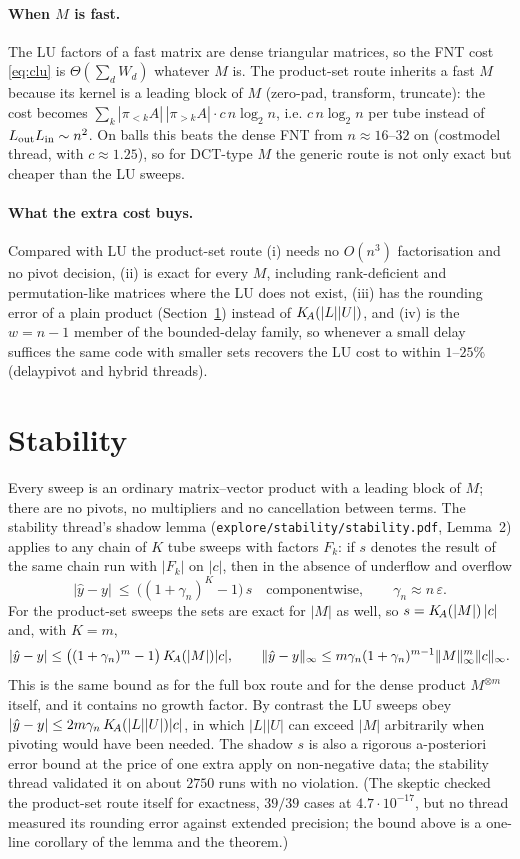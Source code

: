 \documentclass[11pt]{article}
\newcommand{\pr}[1]{\pi_{#1}}
\begin{document}
\paragraph{When $M$ is fast.} The LU factors of a fast matrix are dense triangular matrices, so the FNT cost
\eqref{eq:clu} is $\Theta(\sum_dW_d)$ whatever $M$ is. The product-set route inherits a fast $M$ because its kernel is a
leading block of $M$ (zero-pad, transform, truncate): the cost becomes $\sum_k|\pr{<k}A|\,|\pr{>k}A|\cdot c\,n\log_2n$, i.e.
$c\,n\log_2 n$ per tube instead of $L_{\rm out}L_{\rm in}\sim n^2$. On balls this beats the dense FNT from $n\approx16$--$32$ on
(costmodel thread, with $c\approx1.25$), so for DCT-type $M$ the generic route is not only exact but cheaper than the LU sweeps.

\paragraph{What the extra cost buys.} Compared with LU the product-set route (i) needs no $O(n^3)$ factorisation and no
pivot decision, (ii) is exact for every $M$, including rank-deficient and permutation-like matrices where the LU does not
exist, (iii) has the rounding error of a plain product (Section~\ref{sec:stab}) instead of $K_{\!A}(|L||U|)$, and (iv) is the
$w=n-1$ member of the bounded-delay family, so whenever a small delay suffices the same code with smaller sets
recovers the LU cost to within $1$--$25\%$ (delaypivot and hybrid threads).

\section{Stability}\label{sec:stab}
Every sweep is an ordinary matrix--vector product with a leading block of $M$; there are no pivots, no
multipliers and no cancellation between terms. The stability thread's shadow lemma
(\texttt{explore/stability/stability.pdf}, Lemma~2) applies to any chain of $K$ tube sweeps with factors $F_k$: if
$s$ denotes the result of the same chain run with $|F_k|$ on $|c|$, then in the absence of underflow and overflow
\[
 |\hat y-y|\ \le\ \big((1+\gamma_n)^K-1\big)\,s\quad\text{componentwise},\qquad \gamma_n\approx n\,\varepsilon .
\]
For the product-set sweeps the sets are exact for $|M|$ as well, so $s=K_{\!A}(|M|)\,|c|$ and, with $K=m$,
\[
 |\hat y-y|\le\big((1+\gamma_n)^m-1\big)\,K_{\!A}(|M|)|c|,\qquad \|\hat y-y\|_\infty\le m\gamma_n(1+\gamma_n)^{m-1}\|M\|_\infty^m\|c\|_\infty .
\]
This is the same bound as for the full box route and for the dense product $M^{\otimes m}$ itself, and it contains
no growth factor. By contrast the LU sweeps obey $|\hat y-y|\le2m\gamma_n\,K_{\!A}(|L||U|)|c|$, in which $|L||U|$ can exceed
$|M|$ arbitrarily when pivoting would have been needed. The shadow $s$ is also a rigorous a-posteriori error bound
at the price of one extra apply on non-negative data; the stability thread validated it on about $2750$ runs with
no violation. (The skeptic checked the product-set route itself for exactness, $39/39$ cases at $4.7\cdot10^{-17}$, but
no thread measured its rounding error against extended precision; the bound above is a one-line corollary of the
lemma and the theorem.)
\end{document}
